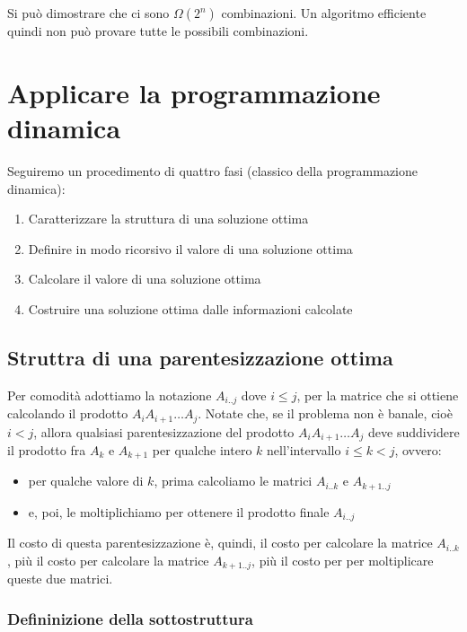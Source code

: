 Si può dimostrare che ci sono $\Omega(2^n)$ combinazioni.
Un algoritmo efficiente quindi non può provare tutte le possibili
combinazioni.

\section{Applicare la programmazione dinamica}

Seguiremo un procedimento di quattro fasi (classico della programmazione
dinamica):
\begin{enumerate}
  \item Caratterizzare la struttura di una soluzione ottima
  \item Definire in modo ricorsivo il valore di una soluzione ottima
  \item Calcolare il valore di una soluzione ottima
  \item Costruire una soluzione ottima dalle informazioni calcolate
\end{enumerate}

\subsection{Struttra di una parentesizzazione ottima}

Per comodità adottiamo la notazione $A_{i..j}$ dove $i \le j$, per
la matrice che si ottiene calcolando il prodotto
$A_i A_{i+1} \ldots A_j$. Notate che, se il problema non è banale, cioè
$i < j$, allora qualsiasi parentesizzazione del prodotto
$A_i A_{i+1} \ldots A_j$ deve suddividere il prodotto fra $A_k$ e
$A_{k+1}$ per qualche intero $k$ nell'intervallo $i \le k < j$,
ovvero:
\begin{itemize}
  \item per qualche valore di $k$, prima calcoliamo le matrici
        $A_{i..k}$ e $A_{k+1..j}$
  \item e, poi, le moltiplichiamo per ottenere
        il prodotto finale $A_{i..j}$
\end{itemize}

Il costo di questa parentesizzazione è, quindi, il costo per calcolare
la matrice $A_{i..k}$, più il costo per calcolare la matrice
$A_{k+1..j}$, più il costo per per moltiplicare queste due matrici.


\subsubsection{Defininizione della sottostruttura}

